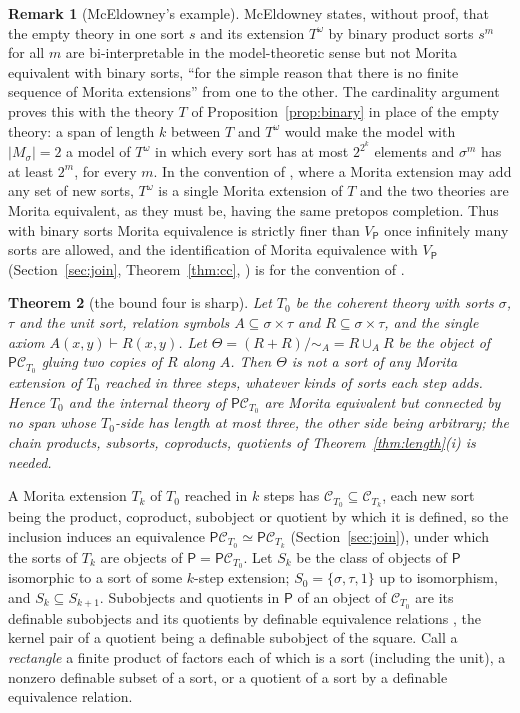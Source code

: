\documentclass[11pt]{amsart}
\newtheorem{thm}{Theorem}[section]
\theoremstyle{definition}
\newtheorem{rem}[thm]{Remark}
\newcommand{\PP}{\mathsf P}
\newcommand{\cC}{\mathcal C}
\begin{document}
\begin{rem}[McEldowney's example]\label{rem:mcel}
McEldowney \cite[p.~20]{McEl20} states, without proof, that the empty
theory in one sort $s$ and its extension $T^\omega$ by binary product
sorts $s^m$ for all $m$ are bi-interpretable in the model-theoretic
sense but not Morita equivalent with binary sorts, ``for the simple
reason that there is no finite sequence of Morita extensions'' from one
to the other. The cardinality argument proves this with the theory $T$
of Proposition~\ref{prop:binary} in place of the empty theory: a span
of length $k$ between $T$ and $T^\omega$ would make the model with
$|M_\sigma|=2$ a model of $T^\omega$ in which every sort has at most
$2^{2^k}$ elements and $\sigma^{m}$ has at least $2^m$, for every $m$.
In the convention of \cite[Def.~2.2]{Tsem17}, where a Morita extension
may add any set of new sorts, $T^\omega$ is a single Morita extension
of $T$ and the two theories are Morita equivalent, as they must be,
having the same pretopos completion. Thus with binary sorts Morita
equivalence is strictly finer than $V_\PP$ once infinitely many sorts
are allowed, and the identification of Morita equivalence with $V_\PP$
(Section~\ref{sec:join}, Theorem~\ref{thm:cc}, \cite[Thm.~4.7]{Tsem17})
is for the convention of \cite{Tsem17}.
\end{rem}

\begin{thm}[the bound four is sharp]\label{thm:sharp}
Let $T_0$ be the coherent theory with sorts $\sigma$, $\tau$ and the unit
sort, relation symbols $A\subseteq\sigma\times\tau$ and
$R\subseteq\sigma\times\tau$, and the single axiom $A(x,y)\vdash R(x,y)$.
Let $\Theta=(R+R)/{\sim_A}=R\cup_A R$ be the object of $\PP\cC_{T_0}$
gluing two copies of $R$ along $A$. Then $\Theta$ is not a sort of any
Morita extension of $T_0$ reached in three steps, whatever kinds of
sorts each step adds. Hence $T_0$ and the internal theory of
$\PP\cC_{T_0}$ are Morita equivalent but connected by no span whose
$T_0$-side has length at most three, the other side being arbitrary; the
chain products, subsorts, coproducts, quotients of
Theorem~\ref{thm:length}(i) is needed.
\end{thm}

A Morita extension $T_k$ of $T_0$ reached in $k$ steps has
$\cC_{T_0}\subseteq\cC_{T_k}$, each new sort being the product,
coproduct, subobject or quotient by which it is defined, so the
inclusion induces an equivalence $\PP\cC_{T_0}\simeq\PP\cC_{T_k}$
(Section~\ref{sec:join}), under which the sorts of $T_k$ are objects of
$\PP=\PP\cC_{T_0}$. Let $S_k$ be the class of objects of $\PP$
isomorphic to a sort of some $k$-step extension; $S_0=\{\sigma,\tau,1\}$
up to isomorphism, and $S_k\subseteq S_{k+1}$. Subobjects and quotients
in $\PP$ of an object of $\cC_{T_0}$ are its definable subobjects and
its quotients by definable equivalence relations \cite{CV98}, the kernel
pair of a quotient being a definable subobject of the square. Call a
\emph{rectangle} a finite product of factors each of which is a sort
(including the unit), a nonzero definable subset of a sort, or a
quotient of a sort by a definable equivalence relation.
\end{document}
